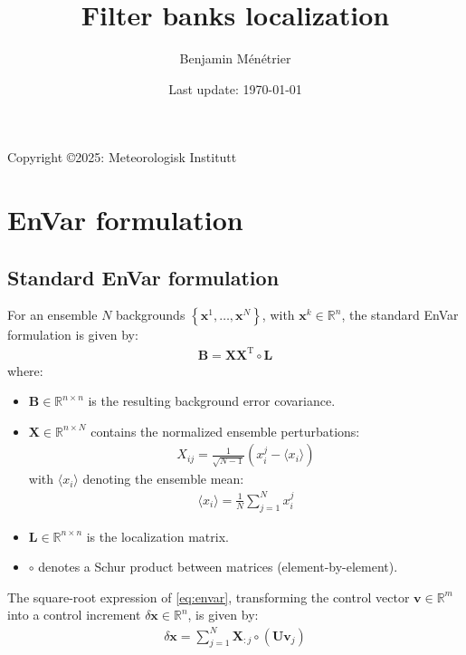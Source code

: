 \documentclass[12pt]{scrartcl}
\begin{document}
\title{Filter banks localization}
\author{Benjamin Ménétrier}
\date{Last update: \today}

\thispagestyle{empty}

\maketitle
\begin{center}
Copyright \copyright 2025: Meteorologisk Institutt
\end{center}


\section{EnVar formulation}

\subsection{Standard EnVar formulation}
For an ensemble $N$ backgrounds $\left\{\mathbf{x}^1,\dots,\mathbf{x}^N\right\}$, with $\mathbf{x}^k \in \mathbb{R}^n$, the standard EnVar formulation is given by:
\begin{align}
\label{eq:envar}
\mathbf{B} = \mathbf{X}\mathbf{X}^\mathrm{T} \circ \mathbf{L}
\end{align}
where:
\begin{itemize}
\item $\mathbf{B} \in \mathbb{R}^{n \times n}$ is the resulting background error covariance.
\item $\mathbf{X} \in \mathbb{R}^{n \times N}$ contains the normalized ensemble perturbations:
\begin{align}
X_{ij} = \frac{1}{\sqrt{N-1}} \left(x^j_i - \langle x_i \rangle\right)
\end{align}
with $\langle x_i \rangle$ denoting the ensemble mean:
\begin{align}
\langle x_i \rangle = \frac{1}{N} \sum_{j=1}^N x^j_i
\end{align}
\item $\mathbf{L} \in \mathbb{R}^{n \times n}$ is the localization matrix.
\item $\circ$ denotes a Schur product between matrices (element-by-element).
\end{itemize}
The square-root expression of \eqref{eq:envar}, transforming the control vector $\mathbf{v} \in \mathbb{R}^m$ into a control increment $\delta \mathbf{x} \in \mathbb{R}^n$, is given by:
\begin{align}
\delta \mathbf{x} = \sum_{j=1}^N \mathbf{X}_{:j} \circ \left(\mathbf{U} \mathbf{v}_j\right)
\end{align}
\end{document}
